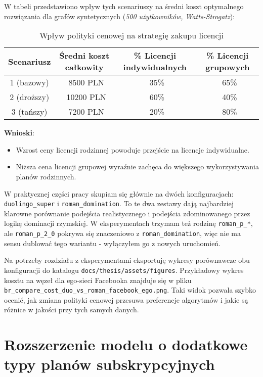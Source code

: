 W tabeli przedstawiono wpływ tych scenariuszy na średni koszt optymalnego rozwiązania dla grafów syntetycznych (\textit{500 użytkowników, Watts-Strogatz}):

\begin{table}[h]
\centering
\begin{tabular}{|c|c|c|c|}
\hline
\textbf{Scenariusz} & \textbf{Średni koszt całkowity} & \textbf{\% Licencji indywidualnych} & \textbf{\% Licencji grupowych} \\
\hline
1 (bazowy) & ~8500 PLN  & ~35\%  & ~65\%  \\
2 (droższy) & ~10200 PLN  & ~60\%  & ~40\%  \\
3 (tańszy) & ~7200 PLN  & ~20\%  & ~80\%  \\
\hline
\end{tabular}
\caption{Wpływ polityki cenowej na strategię zakupu licencji}
\label{tab:pricing_impact}
\end{table}

\textbf{Wnioski}:
\begin{itemize}
    \item Wzrost ceny licencji rodzinnej powoduje przejście na licencje indywidualne.
    \item Niższa cena licencji grupowej wyraźnie zachęca do większego wykorzystywania planów rodzinnych.
\end{itemize}

W praktycznej części pracy skupiam się głównie na dwóch konfiguracjach: \texttt{duolingo\_super} i \texttt{roman\_domination}. To te dwa zestawy dają najbardziej klarowne porównanie podejścia realistycznego i podejścia zdominowanego przez logikę dominacji rzymskiej. W eksperymentach trzymam też rodzinę \texttt{roman\_p\_*}, ale \texttt{roman\_p\_2\_0} pokrywa się znaczeniowo z \texttt{roman\_domination}, więc nie ma sensu dublować tego wariantu - wyłączyłem go z nowych uruchomień.

Na potrzeby rozdziału z eksperymentami eksportuję wykresy porównawcze obu konfiguracji do katalogu \texttt{docs/thesis/assets/figures}. Przykładowy wykres kosztu na węzeł dla ego-sieci Facebooka znajduje się w pliku \texttt{br\_compare\_cost\_duo\_vs\_roman\_facebook\_ego.png}. Taki widok pozwala szybko ocenić, jak zmiana polityki cenowej przesuwa preferencje algorytmów i jakie są różnice w jakości przy tych samych danych.

\section{Rozszerzenie modelu o dodatkowe typy planów subskrypcyjnych}

